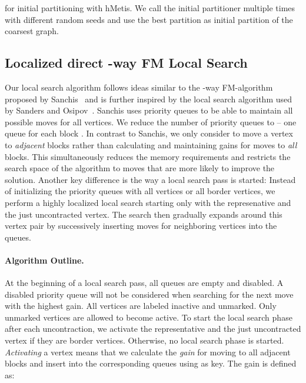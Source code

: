 \documentclass[runningheads,a4paper]{llncs}
\begin{document}
for initial partitioning with hMetis. We call the initial partitioner multiple times with different random seeds and use  the best partition as initial partition of the coarsest graph.

\subsection{Localized direct -way FM Local Search} \label{localizedFM}
Our local search algorithm follows ideas similar to the -way FM-algorithm proposed by Sanchis~\cite{HypergraphKFM} and is further inspired by the local search algorithm used by Sanders and Osipov~\cite{nGP}. Sanchis uses  priority queues
to be able to maintain all possible moves for all vertices. We reduce the number of priority queues to  -- one queue 
for each block . In contrast to Sanchis, we only consider to move a vertex to \emph{adjacent} blocks rather than calculating
and maintaining gains for moves to \emph{all} blocks. This simultaneously reduces the memory requirements and restricts the search
space of the algorithm to moves that are more likely to improve the solution. Another key difference is the way a local search pass
is started: Instead of initializing the priority queues with all vertices or all border vertices, we perform a highly localized 
local search starting only with the represenative and the just uncontracted vertex. The search then gradually expands around
this vertex pair by successively inserting moves for neighboring vertices into the queues.

\paragraph{Algorithm Outline.} 
At the beginning of a local search pass, all
queues are empty and disabled. A disabled priority queue will not be considered when searching for the next move with the highest gain. All vertices are labeled inactive and unmarked. Only unmarked vertices are allowed to 
become active. To start the local search phase after each uncontraction, we activate the representative and the just uncontracted vertex if they are border vertices. Otherwise, no local search phase is started. 
\emph{Activating} a vertex  means that we calculate the \emph{gain}  for moving  to all adjacent blocks  and 
insert   into the corresponding queues  using  as key. The gain  is defined as: 
\end{document}
